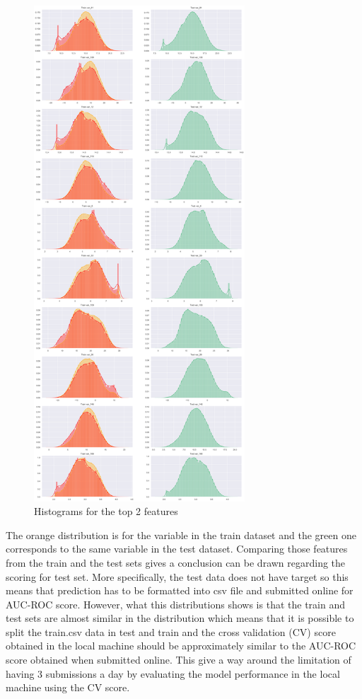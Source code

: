 \documentclass[journal,twoside,web]{ieeecolor}
\begin{document}
\begin{figure}[h!]
  \centering
  \includegraphics[width=3.1in]{project/code/Histograms-dist-of-features.png}
  \caption{Histograms for the top 2 features}
  \label{fig:fig4}
\end{figure}


The orange distribution is for the variable in the train dataset and the green one corresponds to the same variable in the test dataset. Comparing those features from the train and the test sets gives a conclusion can be drawn regarding the scoring for test set. More specifically, the test data does not have target so this means that prediction has to be formatted into csv file and submitted online for AUC-ROC score. However, what this distributions shows is that the train and test sets are almost similar in the distribution which means that it is possible to split the train.csv data in test and train and the cross validation (CV) score obtained in the local machine should be approximately similar to the AUC-ROC score obtained when submitted online. This give a way around the limitation of having 3 submissions a day by evaluating the model performance in the local machine using the CV score. 
\end{document}
